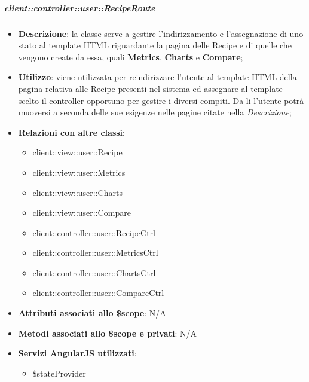 		\subparagraph{client::controller::user::RecipeRoute} %
		\label{subp:bdsm_app_client_controller_user_reciperouteconfig}

			\begin{itemize}
				\item \textbf{Descrizione}: la classe serve a gestire l'indirizzamento e l'assegnazione di uno stato al template HTML riguardante la pagina delle Recipe e di quelle che vengono create da essa, quali \textbf{Metrics}, \textbf{Charts} e \textbf{Compare};
				\item \textbf{Utilizzo}: viene utilizzata per reindirizzare l'utente al template HTML della pagina relativa alle Recipe presenti nel sistema ed assegnare al template scelto il controller opportuno per gestire i diversi compiti.  Da li l'utente potrà muoversi a seconda delle sue esigenze nelle pagine citate nella \emph{Descrizione};
				\item \textbf{Relazioni con altre classi}:
					\begin{itemize}
						\item client::view::user::Recipe
						\item client::view::user::Metrics
						\item client::view::user::Charts
						\item client::view::user::Compare
						\item client::controller::user::RecipeCtrl
						\item client::controller::user::MetricsCtrl
						\item client::controller::user::ChartsCtrl
						\item client::controller::user::CompareCtrl
					\end{itemize}
				\item \textbf{Attributi associati allo \$scope}: N/A
				\item \textbf{Metodi associati allo \$scope e privati}: N/A
				\item \textbf{Servizi AngularJS utilizzati}:
					\begin{itemize}
						\item \$stateProvider
					\end{itemize}
			\end{itemize}

